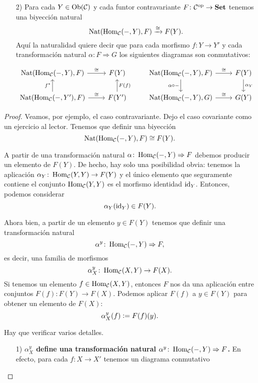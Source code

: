 \documentclass{article}
\numberwithin{equation}{section}
\theoremstyle{definition}
\begin{document}
\begin{proposicion}
\begin{enumerate}
  \item[2)] Para cada $Y\in \operatorname{Ob}(\mathcal{C})$ y cada funtor contravariante
    $F\colon \mathcal{C}^\mathrm{op} \to \text{\bf Set}$ tenemos una biyección
    natural
    $$\operatorname{Nat} (\operatorname{Hom}_\mathcal{C} (-,Y), F) \xrightarrow{\cong} F (Y).$$
    Aquí la naturalidad quiere decir que para cada morfismo $f\colon Y\to Y'$ y
    cada transformación natural $\alpha\colon F\Rightarrow G$ los siguientes
    diagramas son conmutativos:

    \[ \begin{tikzcd}
        \Nat (\Hom_\vcateg{C} (-,Y), F)\ar{r}{\isom} & F (Y) & \Nat (\Hom_\vcateg{C} (-, Y), F)\ar{d}[swap]{\alpha\circ -}\ar{r}{\isom} & F (Y)\ar{d}{\alpha_Y} \\
        \Nat (\Hom_\vcateg{C} (-,Y'), F) \ar{r}{\isom} \ar{u}{f^*} & F (Y')\ar{u}[swap]{F (f)} & \Nat (\Hom_\vcateg{C} (-,Y), G) \ar{r}{\isom} & G (Y)
      \end{tikzcd} \]
  \end{enumerate}

  \begin{proof}
    Veamos, por ejemplo, el caso contravariante. Dejo el caso covariante como un
    ejercicio al lector. Tenemos que definir una biyección
    $$\operatorname{Nat} (\operatorname{Hom}_\mathcal{C} (-,Y), F) \cong F (Y).$$

    A partir de una transformación natural
    $\alpha\colon \operatorname{Hom}_\mathcal{C} (-,Y) \Rightarrow F$ debemos producir un
    elemento de $F (Y)$. De hecho, hay solo una posibilidad obvia: tenemos la
    aplicación $\alpha_Y\colon \operatorname{Hom}_\mathcal{C} (Y,Y) \to F (Y)$ y el único
    elemento que seguramente contiene el conjunto $\operatorname{Hom}_\mathcal{C} (Y,Y)$ es el
    morfismo identidad $\mathrm{id}_{Y}$. Entonces, podemos considerar
    $$\alpha_Y (\mathrm{id}_{Y}) \in F (Y).$$

    Ahora bien, a partir de un elemento $y\in F (Y)$ tenemos que definir una
    transformación natural
    $$\alpha^y\colon \operatorname{Hom}_\mathcal{C} (-,Y) \Rightarrow F,$$
    es decir, una familia de morfismos
    $$\alpha^y_X\colon \operatorname{Hom}_\mathcal{C} (X,Y) \to F (X).$$
    Si tenemos un elemento $f\in \operatorname{Hom}_\mathcal{C} (X,Y)$, entonces $F$ nos da una
    aplicación entre conjuntos $F (f)\colon F (Y) \to F (X)$. Podemos aplicar
    $F (f)$ a $y \in F (Y)$ para obtener un elemento de $F (X)$:
    $$\alpha^y_X (f) \mathrel{\mathop:}= F (f) (y).$$

    Hay que verificar varios detalles.

    \begin{enumerate}
    \item[1)] \textbf{$\alpha^y_X$ define una transformación natural
        $\alpha^y\colon \operatorname{Hom}_\mathcal{C} (-,Y) \Rightarrow F$.} En efecto, para
      cada $f\colon X\to X'$ tenemos un diagrama conmutativo


\end{enumerate}
\end{proof}
\end{proposicion}
\end{document}
